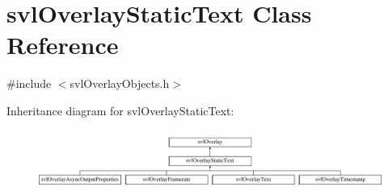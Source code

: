 \hypertarget{classsvl_overlay_static_text}{}\section{svl\+Overlay\+Static\+Text Class Reference}
\label{classsvl_overlay_static_text}


{\ttfamily \#include $<$svl\+Overlay\+Objects.\+h$>$}

Inheritance diagram for svl\+Overlay\+Static\+Text\+:\begin{figure}[H]
\begin{center}
\leavevmode
\includegraphics[height=1.971831cm]{df/d44/classsvl_overlay_static_text}
\end{center}
\end{figure}
